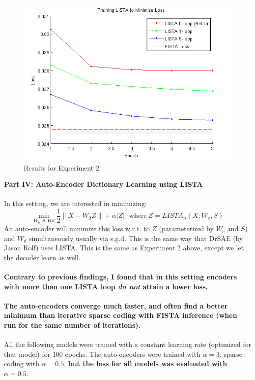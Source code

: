 \documentclass[12pt,a4paper]{report}
\begin{document}
\begin{figure}
	\begin{center}
	\includegraphics[scale=0.75]{LISTA_loss_min.png}
	\end{center}
\caption{Results for Experiment 2}
\end{figure} 

{\bf Part IV: Auto-Encoder Dictionary Learning using LISTA } \\ \\
In this setting, we are interested in minimizing:  
\begin{equation} 
\min_{W_e,S,Wd} \frac{1}{2} \|X - W_d Z\| + \alpha |Z|_1 ~ \mbox{where}~ Z = LISTA_n(X;W_e,S)
\end{equation}
An auto-encoder will minimize this loss w.r.t. to $Z$ (parameterized by $W_e$ and $S$) and $W_d$ simultaneously usually via s.g.d. This is the same way that DrSAE (by Jason Rolf) uses LISTA. This is the same as Experiment 2 above, except we let the decoder learn as well. \\ \\
\textbf{Contrary to previous findings, I found that in this setting encoders with more than one LISTA loop \emph{do not} attain a lower loss.} \\ \\
\textbf{The auto-encoders converge much faster, and often find a better minimum than iterative sparse coding with FISTA inference (when run for the same number of iterations).} \\ \\
All the following models were trained with a constant learning rate (optimized for that model) for 100 epochs. The auto-encoders were trained with $\alpha=3$, sparse coding with $\alpha=0.5$, \textbf{but the loss for all models was evaluated with $\alpha=0.5$}.    
\end{document}
